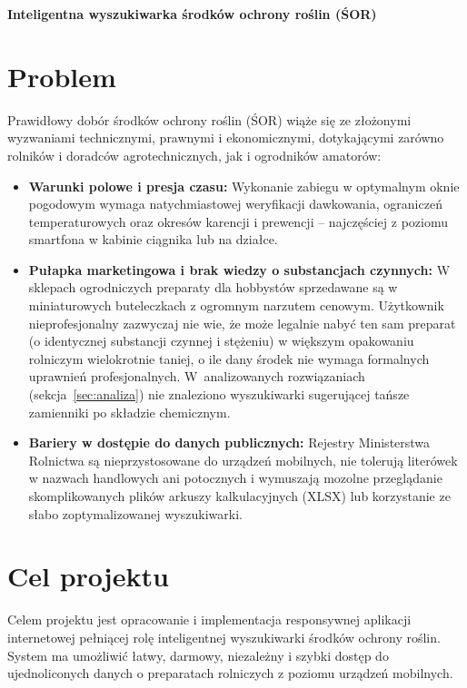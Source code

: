 \documentclass[11pt,a4paper]{article}
\begin{document}
\textbf{Inteligentna wyszukiwarka środków ochrony roślin (ŚOR)}

\section{Problem}
\label{sec:problem}

Prawidłowy dobór środków ochrony roślin (ŚOR) wiąże się ze złożonymi wyzwaniami technicznymi,
prawnymi i ekonomicznymi, dotykającymi zarówno rolników i doradców agrotechnicznych,
jak i ogrodników amatorów:
\begin{itemize}
    \item \textbf{Warunki polowe i presja czasu:} 
    Wykonanie zabiegu w optymalnym oknie pogodowym wymaga natychmiastowej weryfikacji dawkowania,
    ograniczeń temperaturowych oraz okresów karencji i prewencji -- najczęściej z poziomu smartfona
    w kabinie ciągnika lub na działce.
    \item \textbf{Pułapka marketingowa i brak wiedzy o substancjach czynnych:}
    W sklepach ogrodniczych preparaty dla hobbystów sprzedawane są w miniaturowych buteleczkach
    z ogromnym narzutem cenowym. Użytkownik nieprofesjonalny zazwyczaj nie wie, że może legalnie nabyć
    ten sam preparat (o identycznej substancji czynnej i stężeniu) w większym opakowaniu rolniczym wielokrotnie taniej,
    o ile dany środek nie wymaga formalnych uprawnień profesjonalnych. W~analizowanych rozwiązaniach
    (sekcja~\ref{sec:analiza}) nie znaleziono wyszukiwarki sugerującej tańsze zamienniki po składzie chemicznym.
    \item \textbf{Bariery w dostępie do danych publicznych:}
    Rejestry Ministerstwa Rolnictwa są nieprzystosowane do urządzeń mobilnych,
    nie tolerują literówek w nazwach handlowych ani potocznych i wymuszają mozolne przeglądanie
    skomplikowanych plików arkuszy kalkulacyjnych (XLSX) lub korzystanie ze słabo zoptymalizowanej wyszukiwarki.
\end{itemize}



\section{Cel projektu}

Celem projektu jest opracowanie i implementacja responsywnej
aplikacji internetowej pełniącej rolę inteligentnej wyszukiwarki
środków ochrony roślin. System ma umożliwić łatwy, darmowy,
niezależny i szybki dostęp do ujednoliconych danych o preparatach
rolniczych z poziomu urządzeń mobilnych.
\end{document}
